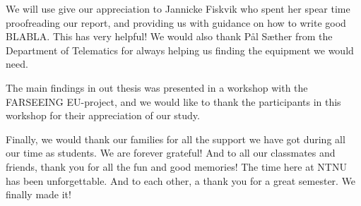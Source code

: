 \documentclass[b5paper,twoside,openright,11pt]{report}
\begin{document}
We will use give our appreciation to Jannicke Fiskvik who spent her spear time proofreading our report, and providing us with guidance on how to write good BLABLA. This has very helpful! We would also thank Pål Sæther from the Department of Telematics for always helping us finding the equipment we would need. 

The main findings in out thesis was presented in a workshop with the FARSEEING EU-project, and we would like to thank the participants in this workshop for their appreciation of our study. 

Finally, we would thank our families for all the support we have got during all our time as students. We are forever grateful! And to all our classmates and friends, thank you for all the fun and good memories! The time here at NTNU has been unforgettable. And to each other, a thank you for a great semester. We finally made it!   

\cleardoublepage
{}
\tableofcontents
\cleardoublepage

\cleardoublepage
\listoffigures
\cleardoublepage
\listoftables
\cleardoublepage
{}
\pagestyle{fancy}
\fancyhead[LE]{\thepage}
\fancyhead[RE]{\leftmark}
\fancyhead[RO]{\thepage}
\fancyhead[LO]{\rightmark}
\fancyfoot{}
\cleardoublepage

\cleardoublepage

\cleardoublepage

\cleardoublepage

\cleardoublepage

\cleardoublepage

\cleardoublepage

\cleardoublepage

\cleardoublepage

\cleardoublepage

\cleardoublepage

\cleardoublepage

\cleardoublepage

\cleardoublepage


\pagestyle{plain}
\cleardoublepage
\appendix 
  
\cleardoublepage
\end{document}
